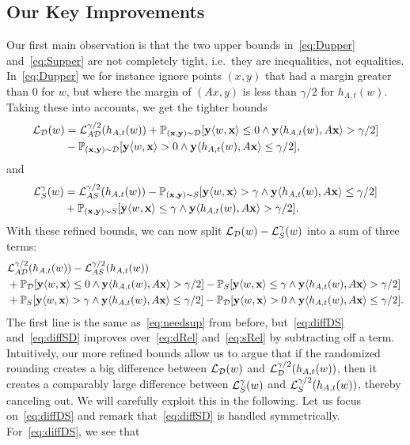 \subsection{Our Key Improvements}
Our first main observation is that the two upper bounds in~\eqref{eq:Dupper} and~\eqref{eq:Supper} are not completely tight, i.e.\ they are inequalities, not equalities. In~\eqref{eq:Dupper} we for instance ignore points $(x,y)$ that had a margin greater than $0$ for $w$, but where the margin of $(Ax,y)$ is less than $\gamma/2$ for $h_{A,t}(w)$. Taking these into accounts, we get the tighter bounds
\begin{align*}
    \mathcal{L}_{\mathcal{D}}(w) &= \mathcal{L}^{\gamma/2}_{A \mathcal{D}}(h_{A,t}(w))+ \mathbb{P}_{(\mathbf{x},\mathbf{y}) \sim \mathcal{D}}[\mathbf{y} \langle w, \mathbf{x}\rangle \leq 0 \wedge \mathbf{y} \langle h_{A,t}(w) , A\mathbf{x}\rangle > \gamma/2] \\
    &- \mathbb{P}_{(\mathbf{x},\mathbf{y}) \sim \mathcal{D}}[\mathbf{y} \langle w, \mathbf{x}\rangle > 0 \wedge \mathbf{y} \langle h_{A,t}(w) , A\mathbf{x}\rangle \leq \gamma/2],
\end{align*}
and
\begin{align*}
\mathcal{L}^\gamma_S(w) &= \mathcal{L}^{\gamma/2}_{A S}(h_{A,t}(w)) - \mathbb{P}_{(\mathbf{x},\mathbf{y}) \sim S}[\mathbf{y} \langle w, \mathbf{x}\rangle > \gamma \wedge \mathbf{y} \langle h_{A,t}(w) , A\mathbf{x}\rangle \leq \gamma/2] \\
&+ \mathbb{P}_{(\mathbf{x},\mathbf{y}) \sim S}[\mathbf{y} \langle w, \mathbf{x}\rangle \leq \gamma \wedge \mathbf{y} \langle h_{A,t}(w) , A\mathbf{x}\rangle > \gamma/2].
\end{align*}
With these refined bounds, we can now split $\mathcal{L}_{\mathcal{D}}(w)-\mathcal{L}^\gamma_S(w)$ into a sum of three terms:
\begin{align}
    &\mathcal{L}^{\gamma/2}_{A \mathcal{D}}(h_{A,t}(w)) - \mathcal{L}^{\gamma/2}_{A S}(h_{A,t}(w)) \nonumber\\ &+
    \mathbb{P}_{\mathcal{D}}[\mathbf{y} \langle w, \mathbf{x}\rangle \leq 0 \wedge \mathbf{y} \langle h_{A,t}(w) , A\mathbf{x}\rangle > \gamma/2] - \mathbb{P}_S[\mathbf{y} \langle w, \mathbf{x}\rangle \leq \gamma \wedge \mathbf{y} \langle h_{A,t}(w) , A\mathbf{x}\rangle > \gamma/2]\label{eq:diffDS} \\ &+
    \mathbb{P}_S[\mathbf{y} \langle w, \mathbf{x}\rangle > \gamma \wedge \mathbf{y} \langle h_{A,t}(w) , A\mathbf{x}\rangle \leq \gamma/2] - \mathbb{P}_{\mathcal{D}}[\mathbf{y} \langle w, \mathbf{x}\rangle > 0 \wedge \mathbf{y} \langle h_{A,t}(w) , A\mathbf{x}\rangle \leq \gamma/2].\label{eq:diffSD} 
\end{align}
The first line is the same as~\eqref{eq:needsup} from before, but~\eqref{eq:diffDS} and~\eqref{eq:diffSD} improves over~\eqref{eq:dRel} and~\eqref{eq:sRel} by subtracting off a term. Intuitively, our more refined bounds allow us to argue that if the randomized rounding creates a big difference between $\mathcal{L}_{\mathcal{D}}(w)$ and $\mathcal{L}^{\gamma/2}_{\mathcal{D}}(h_{A,t}(w))$, then it creates a comparably large difference between $\mathcal{L}_{S}^\gamma(w)$ and $\mathcal{L}^{\gamma/2}_S(h_{A,t}(w))$, thereby canceling out. We will carefully exploit this in the following. Let us focus on~\eqref{eq:diffDS} and remark that~\eqref{eq:diffSD} is handled symmetrically. For~\eqref{eq:diffDS}, we see that
